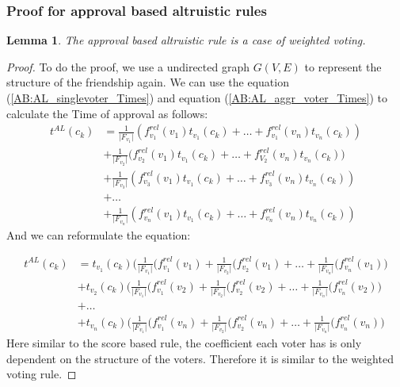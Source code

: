 \documentclass{article}
\newtheorem{lemma}[theorem]{Lemma}
\begin{document}
\subsubsection{Proof for approval based altruistic rules}


\begin{lemma}
The approval based altruistic rule is a case of weighted voting.
\end{lemma}

\begin{proof}
To do the proof, we use a undirected graph $G(V,E)$ to represent the structure of the friendship again. We can use the equation (\ref{AB:AL_singlevoter_Times}) and equation  (\ref{AB:AL_aggr_voter_Times})  to calculate the Time of approval as follows:
\begin{equation*}
\begin{split}
t^{AL}(c_k) &= \frac{1}{\vert F_{v_1}\vert}(f_{v_1}^{rel}(v_1)t_{v_1}(c_k) + \dots + f_{v_1}^{rel}(v_n)t_{v_n}(c_k)) \\
            &+ \frac{1}{\vert F_{v_2}\vert}\Big(f_{v_2}^{rel}(v_1)t_{v_1}(c_k) + \dots + f_{V_2}^{rel}(v_n)t_{v_n}(c_k)\Big) \\
            &+ \frac{1}{\vert F_{v_3}\vert}(f_{v_3}^{rel}(v_1)t_{v_1}(c_k) + \dots + f_{v_3}^{rel}(v_n)t_{v_n}(c_k)) \\
            &+ \dots \\ 
            &+ \frac{1}{\vert F_{v_n}\vert}(f_{v_n}^{rel}(v_1)t_{v_1}(c_k) + \dots + f_{v_n}^{rel}(v_n)t_{v_n}(c_k))
\end{split}
\end{equation*}
And we can reformulate the equation:

\begin{equation*}
\begin{split}
t^{AL}(c_k) &= t_{v_1}(c_k)\big(\frac{1}{\vert F_{v_1}\vert}(f_{v_1}^{rel}(v_1) +  \frac{1}{\vert F_{v_2}\vert}(f_{v_2}^{rel}(v_1)+ \dots +\frac{1}{\vert F_{v_n}\vert}(f_{v_n}^{rel}(v_1)\big) \\
            &+ t_{v_2}(c_k)\big(\frac{1}{\vert F_{v_1}\vert}(f_{v_1}^{rel}(v_2) +  \frac{1}{\vert F_{v_2}\vert}(f_{v_2}^{rel}(v_2)+ \dots +\frac{1}{\vert F_{v_n}\vert}(f_{v_n}^{rel}(v_2)\big) \\
             &+  \dots  \\
            &+ t_{v_n}(c_k)\big(\frac{1}{\vert F_{v_1}\vert}(f_{v_1}^{rel}(v_n) +  \frac{1}{\vert F_{v_2}\vert}(f_{v_2}^{rel}(v_n)+ \dots +\frac{1}{\vert F_{v_n}\vert}(f_{v_n}^{rel}(v_n)\big) 
\end{split}
\end{equation*}
Here similar to the score based rule, the coefficient each voter has is only dependent on the structure of the voters. Therefore it is similar to the weighted voting rule.
\end{proof}
\end{document}
